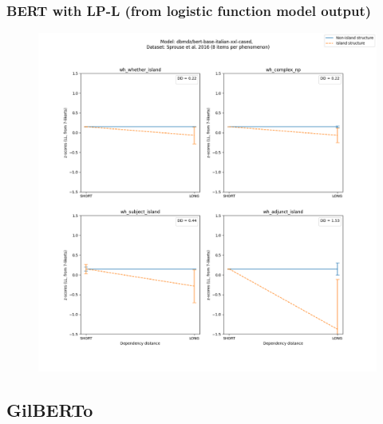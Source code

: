 \subsubsection{BERT with LP-L (from logistic function model output)}
\begin{figure}[h]
	\centering
	\includegraphics[width=1\textwidth]{images/AppendixA/Sprouse_wh_dbmdz_bert-base-italian-xxl-cased_LL-zscores-likert-2022-07-11.png} 
\end{figure}

\clearpage
\subsection{GilBERTo}

